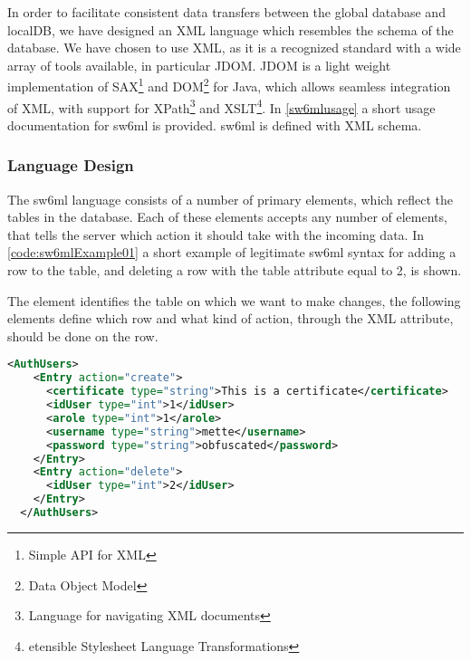 In order to facilitate consistent data transfers between the global database and localDB, we have designed an XML language which resembles
the schema of the database. We have chosen to use XML, as it is a recognized standard with a wide array of tools available, in particular JDOM\cite{www.jdom.org}.
JDOM is a light weight implementation of SAX\footnote{Simple API for XML\cite{SAX}} and DOM\footnote{Data Object Model} for Java, which allows seamless integration of XML, with support for XPath\footnote{Language for navigating XML documents\cite{xPath}} and XSLT\footnote{etensible Stylesheet Language Transformations\cite{xslt}}.
In \autoref{sw6mlusage} a short usage documentation for sw6ml is provided. sw6ml is defined with XML schema.

\subsubsection{Language Design}

The sw6ml language consists of a number of primary elements, which reflect the tables in the database. Each of these elements accepts any number of  elements, that tells
the server which action it should take with the incoming data.
In \autoref{code:sw6mlExample01} a short example of legitimate sw6ml syntax for adding a row to the  table, and deleting a row with the  table attribute equal to 2, is shown.

The  element identifies the table on which we want to make changes, the following  elements
define which row and what kind of action, through the  XML attribute, should be done on the row. 

\begin{Code}
\begin{lstlisting}[label=code:sw6mlExample01,language=XML,caption=Example of sw6ml syntax]
 <AuthUsers>
    <Entry action="create">
      <certificate type="string">This is a certificate</certificate>
      <idUser type="int">1</idUser>
      <arole type="int">1</arole>
      <username type="string">mette</username>
      <password type="string">obfuscated</password>
    </Entry>
    <Entry action="delete">
      <idUser type="int">2</idUser>
    </Entry>
  </AuthUsers>
\end{lstlisting}
\end{Code}

